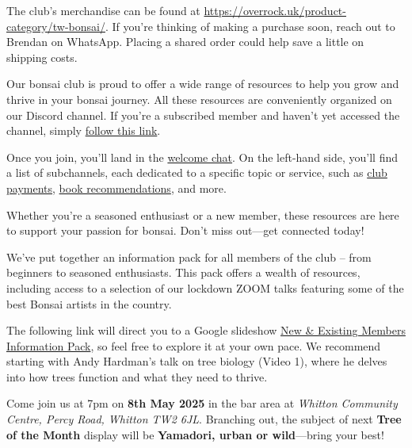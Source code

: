 \label{2025-05-news}
\noindent
The club's merchandise can be found at \url{https://overrock.uk/product-category/tw-bonsai/}.
If you're thinking of making a purchase soon, reach out to Brendan on WhatsApp.
Placing a shared order could help save a little on shipping costs.

\medskip
{}
\noindent  
Our bonsai club is proud to offer a wide range of resources to help you grow and thrive in your bonsai journey.
All these resources are conveniently organized on our Discord channel.
If you're a subscribed member and haven’t yet accessed the channel, simply \href{https://discord.gg/N6yka6XJ}{follow this link}.

Once you join, you'll land in the \href{https://discord.com/channels/873817545013071872/1118677826208550923}{welcome chat}.
On the left\--hand side, you'll find a list of subchannels, each dedicated to a specific topic or service, such as \href{https://discord.com/channels/873817545013071872/1039691122148130876}{club payments}, \href{https://discord.com/channels/873817545013071872/1001189937409949698}{book recommendations}, and more.

Whether you're a seasoned enthusiast or a new member, these resources are here to support your passion for bonsai.
Don't miss out---get connected today!

\medskip	
{}
\noindent
We've put together an information pack for all members of the club – from beginners to seasoned enthusiasts.
This pack offers a wealth of resources, including access to a selection of our lockdown ZOOM talks featuring some of the best Bonsai artists in the country.

The following link will direct you to a Google slideshow \href{https://docs.google.com/presentation/d/1L5SRA_ZSvnGMLbRt0CSf-Uz7BaiOfxOs7OUHMM_XrTY/edit?usp=sharing}{New \& Existing Members Information Pack}, so feel free to explore it at your own pace.
We recommend starting with Andy Hardman’s talk on tree biology (Video 1), where he delves into how trees function and what they need to thrive.

\medskip
{}
\noindent
Come join us at 7pm on \textbf{8th May 2025} in the bar area at \emph{Whitton Community Centre, Percy Road, Whitton TW2 6JL}.
Branching out, the subject of next \textbf{Tree of the Month} display will be \textbf{Yamadori, urban or wild}---bring your best!
	

